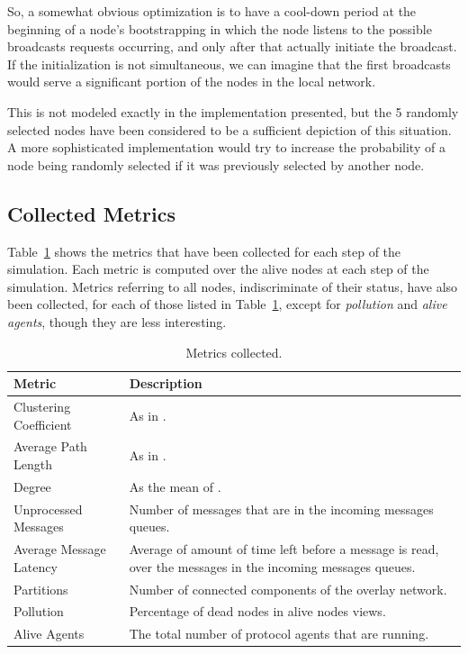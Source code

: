 \documentclass[a4paper]{ifacconf}
\begin{document}
So, a somewhat obvious optimization is to have a cool-down period at the beginning of a node's bootstrapping in which the node listens to the possible broadcasts requests occurring, and only after that actually initiate the broadcast.
If the initialization is not simultaneous, we can imagine that the first broadcasts would serve a significant portion of the nodes in the local network.

This is not modeled exactly in the implementation presented, but the 5 randomly selected nodes have been considered to be a sufficient depiction of this situation.
A more sophisticated implementation would try to increase the probability of a node being randomly selected if it was previously selected by another node.

\subsection{Collected Metrics}\label{sec:metrics}

Table~\ref{tab:metrics} shows the metrics that have been collected for each step of the simulation.
Each metric is computed over the alive nodes at each step of the simulation.
Metrics referring to all nodes, indiscriminate of their status, have also been collected, for each of those listed in Table~\ref{tab:metrics}, except for \emph{pollution} and \emph{alive agents}, though they are less interesting.

\begin{table}
    \centering\begin{tabular}{lp{.5\linewidth}}
        Metric & Description \\
        \hline
        Clustering Coefficient & As in \cite[p. 11]{slides}. \\
        Average Path Length & As in \cite[p. 13]{slides}. \\
        Degree & As the mean of \cite[p. 15]{slides}. \\
        Unprocessed Messages & Number of messages that are in the incoming messages queues. \\
        Average Message Latency & Average of amount of time left before a message is read, over the messages in the incoming messages queues. \\
        Partitions & Number of connected components of the overlay network. \\
        Pollution & Percentage of dead nodes in alive nodes views. \\
        Alive Agents & The total number of protocol agents that are running. \\
    \end{tabular}
    \caption{Metrics collected.}
    \label{tab:metrics}
\end{table}
\end{document}
